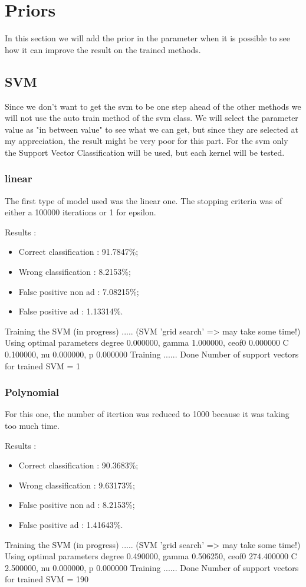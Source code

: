 \chapter{Priors}

In this section we will add the prior in the parameter when it is possible to see how it can improve the result on the trained methods.

\section{SVM}

Since we don't want to get the svm to be one step ahead of the other methods we will not use the auto train method of the svm class. We will select the parameter value as "in between value" to see what we can get, but since they are selected at my appreciation, the result might be very poor for this part.
For the svm only the Support Vector Classification will be used, but each kernel will be tested.


\subsection{linear}

The first type of model used was the linear one. The stopping criteria was of either a 100000 iterations or 1 for epsilon.

Results :
\begin{itemize}
  \item Correct classification : 91.7847\%;
  \item Wrong classification : 8.2153\%;
  \item False positive non ad : 7.08215\%;
  \item False positive ad : 1.13314\%.
\end{itemize}

Training the SVM (in progress) ..... (SVM 'grid search' => may take some time!)
Using optimal parameters degree 0.000000, gamma 1.000000, ceof0 0.000000
	 C 0.100000, nu 0.000000, p 0.000000
 Training ...... Done
Number of support vectors for trained SVM = 1

\subsection{Polynomial}

For this one, the number of itertion was reduced to 1000 because it was taking too much time.

Results :
\begin{itemize}
  \item Correct classification : 90.3683\%;
  \item Wrong classification : 9.63173\%;
  \item False positive non ad : 8.2153\%;
  \item False positive ad : 1.41643\%.
\end{itemize}
Training the SVM (in progress) ..... (SVM 'grid search' => may take some time!)
Using optimal parameters degree 0.490000, gamma 0.506250, ceof0 274.400000
	 C 2.500000, nu 0.000000, p 0.000000
 Training ...... Done
Number of support vectors for trained SVM = 190

